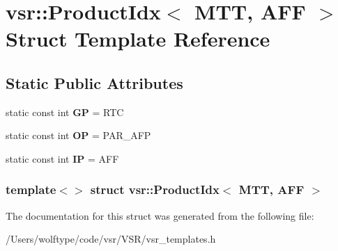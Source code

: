 \hypertarget{structvsr_1_1_product_idx_3_01_m_t_t_00_01_a_f_f_01_4}{\section{vsr\-:\-:Product\-Idx$<$ M\-T\-T, A\-F\-F $>$ Struct Template Reference}
\label{structvsr_1_1_product_idx_3_01_m_t_t_00_01_a_f_f_01_4}
}
\subsection*{Static Public Attributes}
\begin{DoxyCompactItemize}
\item 
\hypertarget{structvsr_1_1_product_idx_3_01_m_t_t_00_01_a_f_f_01_4_a7a034a1c55c2d49c117418956ca9115d}{static const int {\bfseries G\-P} = R\-T\-C}\label{structvsr_1_1_product_idx_3_01_m_t_t_00_01_a_f_f_01_4_a7a034a1c55c2d49c117418956ca9115d}

\item 
\hypertarget{structvsr_1_1_product_idx_3_01_m_t_t_00_01_a_f_f_01_4_a24074eab436086bc6ff2af805f8bfd0c}{static const int {\bfseries O\-P} = P\-A\-R\-\_\-\-A\-F\-P}\label{structvsr_1_1_product_idx_3_01_m_t_t_00_01_a_f_f_01_4_a24074eab436086bc6ff2af805f8bfd0c}

\item 
\hypertarget{structvsr_1_1_product_idx_3_01_m_t_t_00_01_a_f_f_01_4_a1dd635711b4d0e0c206f23bc7e513baa}{static const int {\bfseries I\-P} = A\-F\-F}\label{structvsr_1_1_product_idx_3_01_m_t_t_00_01_a_f_f_01_4_a1dd635711b4d0e0c206f23bc7e513baa}

\end{DoxyCompactItemize}
\subsubsection*{template$<$$>$ struct vsr\-::\-Product\-Idx$<$ M\-T\-T, A\-F\-F $>$}



The documentation for this struct was generated from the following file\-:\begin{DoxyCompactItemize}
\item 
/\-Users/wolftype/code/vsr/\-V\-S\-R/vsr\-\_\-templates.\-h\end{DoxyCompactItemize}
